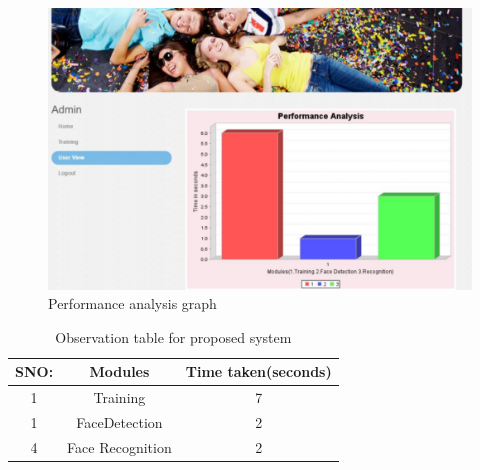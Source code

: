 \begin{figure}[ht]
\begin{minipage}[c]{1\linewidth}

\begin{center}
\includegraphics[width=\textwidth]{newperfomance.png}
            \caption[Performance Analysis Graph]{Performance analysis graph}
             \label{PerformanceAnalysis}
\end{center}
 \end{minipage}          
\end{figure}
\begin{table}[H]
\centering
\caption{Observation table for proposed system}
\label{routing}
\vspace{.5cm}
\begin{tabular}{|c|c|c|}
\hline
\textbf{SNO:} &\textbf{Modules}       &\textbf{Time taken(seconds)}  \\
\hline
1     &Training    &   7      \\
      
\hline
1     &FaceDetection    &   2      \\
      
\hline
4 &Face Recognition&2            \\
\hline
\end{tabular}
\end{table}
\clearpage


\clearpage











